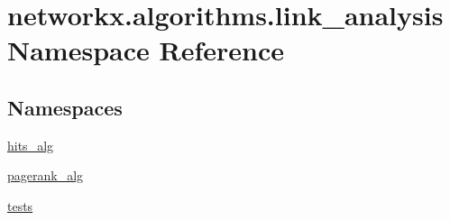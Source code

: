 \hypertarget{namespacenetworkx_1_1algorithms_1_1link__analysis}{}\section{networkx.\+algorithms.\+link\+\_\+analysis Namespace Reference}
\label{namespacenetworkx_1_1algorithms_1_1link__analysis}
\subsection*{Namespaces}
\begin{DoxyCompactItemize}
\item 
 \hyperlink{namespacenetworkx_1_1algorithms_1_1link__analysis_1_1hits__alg}{hits\+\_\+alg}
\item 
 \hyperlink{namespacenetworkx_1_1algorithms_1_1link__analysis_1_1pagerank__alg}{pagerank\+\_\+alg}
\item 
 \hyperlink{namespacenetworkx_1_1algorithms_1_1link__analysis_1_1tests}{tests}
\end{DoxyCompactItemize}
